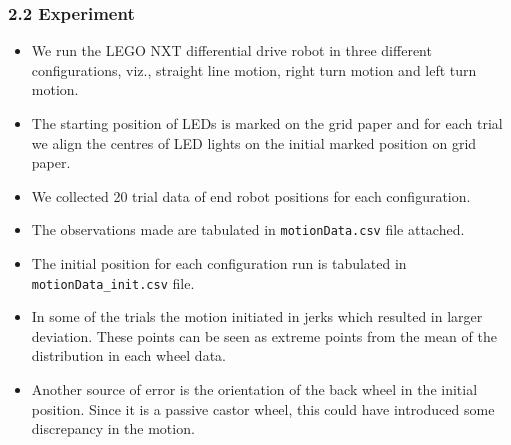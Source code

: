 \documentclass[11pt,a4paper,openright,twoside]{extreport}
\begin{document}
\subsubsection*{2.2 Experiment}
\begin{itemize}
\item We run the LEGO NXT differential drive robot in three different configurations, viz., straight line motion, right turn motion and left turn motion.
\item The starting position of LEDs is marked on the grid paper and for each trial we align the centres of LED lights on the initial marked position on grid paper.
\item We collected 20 trial data of end robot positions for each configuration.
\item The observations made are tabulated in \texttt{motionData.csv} file attached.
\item The initial position for each configuration run is tabulated in \texttt{motionData\_init.csv} file.
\item In some of the trials the motion initiated in jerks which resulted in larger deviation. These points can be seen as extreme points from the mean of the distribution in each wheel data.
\item Another source of error is the orientation of the back wheel in the initial position. Since it is a passive castor wheel, this could have introduced some discrepancy in the motion.


\end{itemize}
\end{document}
